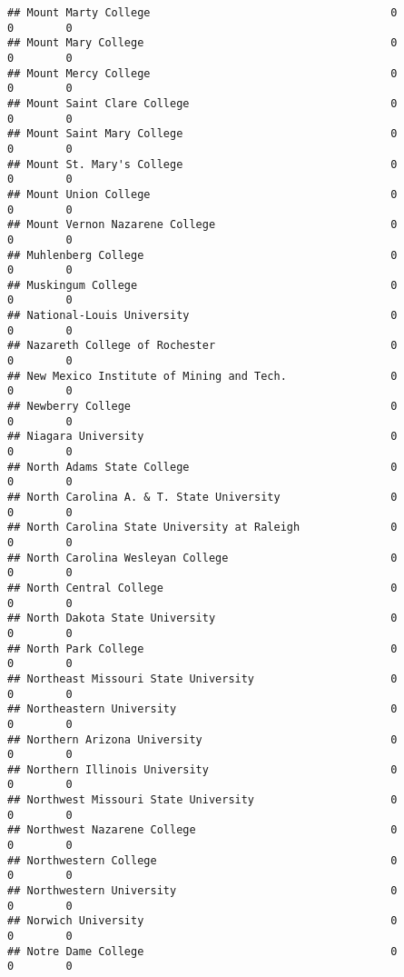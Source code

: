 \documentclass[
]{article}
\begin{document}
\begin{verbatim}
## Mount Marty College                                     0           0        0
## Mount Mary College                                      0           0        0
## Mount Mercy College                                     0           0        0
## Mount Saint Clare College                               0           0        0
## Mount Saint Mary College                                0           0        0
## Mount St. Mary's College                                0           0        0
## Mount Union College                                     0           0        0
## Mount Vernon Nazarene College                           0           0        0
## Muhlenberg College                                      0           0        0
## Muskingum College                                       0           0        0
## National-Louis University                               0           0        0
## Nazareth College of Rochester                           0           0        0
## New Mexico Institute of Mining and Tech.                0           0        0
## Newberry College                                        0           0        0
## Niagara University                                      0           0        0
## North Adams State College                               0           0        0
## North Carolina A. & T. State University                 0           0        0
## North Carolina State University at Raleigh              0           0        0
## North Carolina Wesleyan College                         0           0        0
## North Central College                                   0           0        0
## North Dakota State University                           0           0        0
## North Park College                                      0           0        0
## Northeast Missouri State University                     0           0        0
## Northeastern University                                 0           0        0
## Northern Arizona University                             0           0        0
## Northern Illinois University                            0           0        0
## Northwest Missouri State University                     0           0        0
## Northwest Nazarene College                              0           0        0
## Northwestern College                                    0           0        0
## Northwestern University                                 0           0        0
## Norwich University                                      0           0        0
## Notre Dame College                                      0           0        0

\end{verbatim}
\end{document}
